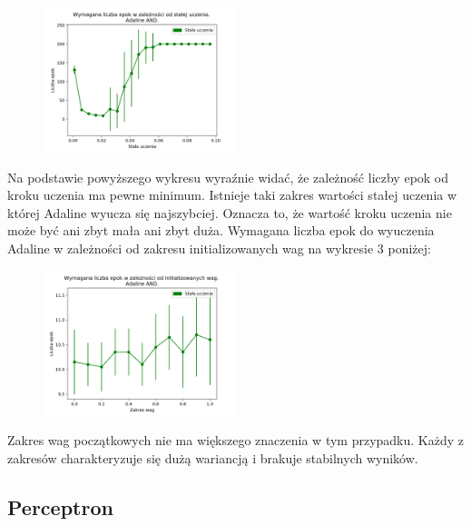 \documentclass{article}
\begin{document}
	\begin{figure}[h]

		\centering
		\caption{}
		\includegraphics[width=0.5\textwidth]{epoki_rate_adaline.png}
		
	\end{figure}   
	Na podstawie powyższego wykresu wyraźnie widać, że zależność liczby epok od kroku uczenia ma pewne minimum. Istnieje taki zakres wartości stałej uczenia w której Adaline wyucza się najszybciej. Oznacza to, że wartość kroku uczenia nie może być ani zbyt mała ani zbyt duża.
	\newpage
	Wymagana liczba epok do wyuczenia Adaline w zależności od zakresu initializowanych wag na wykresie 3 poniżej:
	
	\begin{figure}[h]

		\centering
		\caption{}
		\includegraphics[width=0.5\textwidth]{epoki_wagi_adaline_and.png}
		
	\end{figure}   
	Zakres wag początkowych nie ma większego znaczenia w tym przypadku. Każdy z zakresów charakteryzuje się dużą wariancją i brakuje stabilnych wyników.
\newpage
	\subsection{Perceptron}
\end{document}
